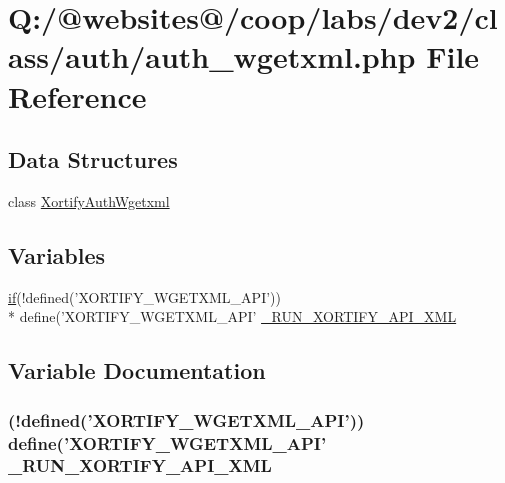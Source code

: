 \hypertarget{auth__wgetxml_8php}{\section{Q\-:/@websites@/coop/labs/dev2/class/auth/auth\-\_\-wgetxml.php File Reference}
\label{auth__wgetxml_8php}
}
\subsection*{Data Structures}
\begin{DoxyCompactItemize}
\item 
class \hyperlink{class_xortify_auth_wgetxml}{Xortify\-Auth\-Wgetxml}
\end{DoxyCompactItemize}
\subsection*{Variables}
\begin{DoxyCompactItemize}
\item 
\hyperlink{index_8php_ae2ccdf355624402b65fc2226f2a661cd}{if}(!defined('X\-O\-R\-T\-I\-F\-Y\-\_\-\-W\-G\-E\-T\-X\-M\-L\-\_\-\-A\-P\-I')) \\*
define('X\-O\-R\-T\-I\-F\-Y\-\_\-\-W\-G\-E\-T\-X\-M\-L\-\_\-\-A\-P\-I' \hyperlink{auth__wgetxml_8php_a02a206e6186196633813b6d0fcab1556}{\-\_\-\-R\-U\-N\-\_\-\-X\-O\-R\-T\-I\-F\-Y\-\_\-\-A\-P\-I\-\_\-\-X\-M\-L}
\end{DoxyCompactItemize}


\subsection{Variable Documentation}
\hypertarget{auth__wgetxml_8php_a02a206e6186196633813b6d0fcab1556}{
\subsubsection[{\-\_\-\-R\-U\-N\-\_\-\-X\-O\-R\-T\-I\-F\-Y\-\_\-\-A\-P\-I\-\_\-\-X\-M\-L}]{ (!defined('X\-O\-R\-T\-I\-F\-Y\-\_\-\-W\-G\-E\-T\-X\-M\-L\-\_\-\-A\-P\-I')) define('X\-O\-R\-T\-I\-F\-Y\-\_\-\-W\-G\-E\-T\-X\-M\-L\-\_\-\-A\-P\-I' \-\_\-\-R\-U\-N\-\_\-\-X\-O\-R\-T\-I\-F\-Y\-\_\-\-A\-P\-I\-\_\-\-X\-M\-L}}\label{auth__wgetxml_8php_a02a206e6186196633813b6d0fcab1556}
